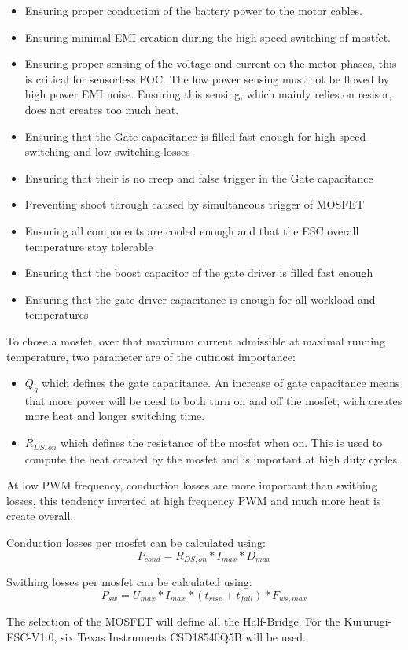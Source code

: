 \documentclass[a4paper, 10pt, conference]{IEEEtran} %
\begin{document}
\begin{itemize}
    \item Ensuring proper conduction of the battery power to the motor cables.
    \item Ensuring minimal EMI creation during the high-speed switching of mostfet.
    \item Ensuring proper sensing of the voltage and current on the motor phases, this is critical for sensorless FOC. The low power sensing must not be flowed by high power EMI noise. Ensuring this sensing, which mainly relies on resisor, does not creates too much heat.
    \item Ensuring that the Gate capacitance is filled fast enough for high speed switching and low switching losses
    \item Ensuring that their is no creep and false trigger in the Gate capacitance
    \item Preventing shoot through caused by simultaneous trigger of MOSFET
    \item Ensuring all components are cooled enough and that the ESC overall temperature stay tolerable
    \item Ensuring that the boost capacitor of the gate driver is filled fast enough
    \item Ensuring that the gate driver capacitance is enough for all workload and temperatures
\end{itemize}

To chose a mosfet, over that maximum current admissible at maximal running temperature, two parameter are of the outmost importance:
\begin{itemize}
    \item $Q_g$ which defines the gate capacitance. An increase of gate capacitance means that more power will be need to both turn on and off the mosfet, wich creates more heat and longer switching time.
    \item $R_{DS,on}$ which defines the resistance of the mosfet when on. This is used to compute the heat created by the mosfet and is important at high duty cycles. 
\end{itemize}
At low PWM frequency, conduction losses are more important than swithing losses, this tendency inverted at high frequency PWM and much more heat is create overall.

Conduction losses per mosfet can be calculated using:
\[
P_{cond} = R_{DS,on} * I_{max} * D_{max}
\]

Swithing losses per mosfet can be calculated using:
\[
P_{sw} = U_{max} * I_{max} * (t_{rise} + t_{fall}) * F_{ws,max}
\]

The selection of the MOSFET will define all the Half-Bridge. For the Kururugi-ESC-V1.0, six Texas Instruments CSD18540Q5B will be used. 
\end{document}
